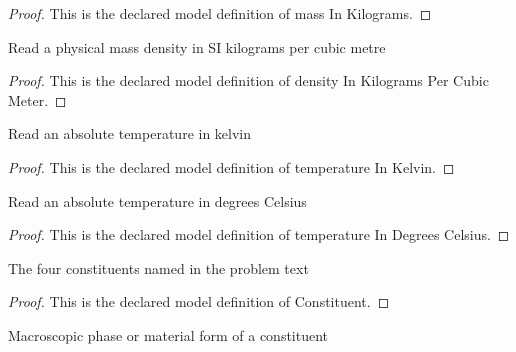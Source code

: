 \begin{proof}
  This is the declared model definition of mass In Kilograms.
\end{proof}
\begin{definition}
  \label{def:physics:phyx-mini-0380:phyxminiproblems-problemphyxmini0380-densityinkilogramspercubicmeter}
  Read a physical mass density in SI kilograms per cubic metre
\end{definition}
\begin{proof}
  This is the declared model definition of density In Kilograms Per Cubic Meter.
\end{proof}
\begin{definition}
  \label{def:physics:phyx-mini-0380:phyxminiproblems-problemphyxmini0380-temperatureinkelvin}
  Read an absolute temperature in kelvin
\end{definition}
\begin{proof}
  This is the declared model definition of temperature In Kelvin.
\end{proof}
\begin{definition}
  \label{def:physics:phyx-mini-0380:phyxminiproblems-problemphyxmini0380-temperatureindegreescelsius}
  Read an absolute temperature in degrees Celsius
\end{definition}
\begin{proof}
  This is the declared model definition of temperature In Degrees Celsius.
\end{proof}
\begin{definition}[Constituent]
  \label{def:physics:phyx-mini-0380:phyxminiproblems-problemphyxmini0380-constituent}
  The four constituents named in the problem text
\end{definition}
\begin{proof}
  This is the declared model definition of Constituent.
\end{proof}
\begin{definition}
  \label{def:physics:phyx-mini-0380:phyxminiproblems-problemphyxmini0380-materialphase}
  Macroscopic phase or material form of a constituent
\end{definition}
